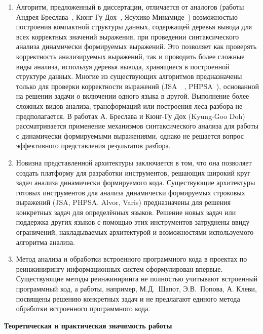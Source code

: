 \begin{enumerate}

\item Алгоритм, предложенный в диссертации, отличается от аналогов (работы Андрея Бреслава~\cite{Alvor1, Alvor2}, Кюнг-Гу Дох~\cite{LrAbstract1, LrAbstract2}, Ясухико Минамиде~\cite{PHPSA}) возможностью построения компактной структуры данных, 
содержащей деревья вывода для всех корректных значений выражения, при проведении синтаксического анализа динамически формируемых выражений. Это позволяет как проверять корректность анализируемых выражений, так и проводить более сложные виды анализа, используя деревья вывода, 
хранящиеся в построенной структуре данных. Многие из существующих алгоритмов предназначены только для проверки корректности 
выражений (JSA~\cite{JSA}~\cite{Alvor1, Alvor2}, PHPSA~\cite{PHPSA}), основанной на решении задачи о включении одного языка в другой. Выполнение более сложных видов анализа, трансформаций или построения леса разбора не предполагается. 
В работах А. Бреслава и Кюнг-Гу Дох (Kyung-Goo Doh)~\cite{LrAbstract1, LrAbstract2} рассматривается применение механизмов синтаксического анализа для работы с динамически формируемыми выражениями, однако не решается вопрос 
эффективного представления результатов разбора. 

\item Новизна представленной архитектуры заключается в том, что она позволяет создать платформу для разработки инструментов, решающих широкий круг задач анализа динамически формируемого кода. Существующие архитектуры готовых инструментов для анализа динамически формируемых строковых выражений (JSA, PHPSA, Alvor, Varis) предназначены для решения конкретных задач для определённых языков. Решение новых задач или поддержка других языков с помощью этих инструментов затруднены ввиду ограничений, накладываемых архитектурой и возможностями используемого алгоритма анализа. 

\item Метод анализа и обработки встроенного программного кода в проектах по реинжинирингу информационных систем сформулирован впервые. Существующие методы реинжиниринга не полностью учитывают встроенный программный код, а работы, например, М.Д.~Шапот, Э.В.~Попова, А. Клеви, посвящены решению конкретных задач и не предлагают единого метода обработки встроенного программного кода.

\end{enumerate}


\textbf{Теоретическая и практическая значимость работы}

